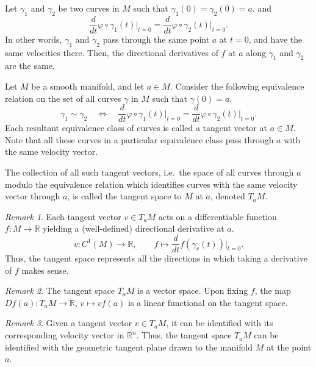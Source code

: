 \documentclass[11pt]{article}
\newcommand{\R}{\mathbb{R}}
\newcommand{\dd}[2]{\frac{d #1}{d #2}}
\theoremstyle{definition}
\theoremstyle{remark}
\newtheorem*{remark}{Remark}
\numberwithin{equation}{section}
\begin{document}
    \begin{lemma}
        Let $\gamma_1$ and $\gamma_2$ be two curves in $M$ such that $\gamma_1(0) =
        \gamma_2(0) = a$, and \[
            \dd{}{t} \varphi\circ \gamma_1(t)\Big|_{t = 0} = \dd{}{t} \varphi\circ
            \gamma_2(t)\Big|_{t = 0}.
        \] In other words, $\gamma_1$ and $\gamma_2$ pass through the same point $a$
        at $t = 0$, and have the same velocities there. Then, the directional
        derivatives of $f$ at $a$ along $\gamma_1$ and $\gamma_2$ are the same.
    \end{lemma}

    \begin{definition}
        Let $M$ be a smooth manifold, and let $a \in M$. Consider the following
        equivalence relation on the set of all curves $\gamma$ in $M$ such that
        $\gamma(0) = a$. \[
            \gamma_1 \sim \gamma_2 \quad\Longleftrightarrow\quad \dd{}{t} \varphi\circ
            \gamma_1(t)\Big|_{t = 0} = \dd{}{t} \varphi\circ \gamma_2(t)\Big|_{t =
            0}.
        \] Each resultant equivalence class of curves is called a tangent vector at
        $a \in M$. Note that all these curves in a particular equivalence class pass
        through $a$ with the same velocity vector.

        The collection of all such tangent vectors, i.e.\ the space of all curves
        through $a$ modulo the equivalence relation which identifies curves with the
        same velocity vector through $a$, is called the tangent space to $M$ at $a$,
        denoted $T_aM$.

        \begin{remark}
            Each tangent vector $v\in T_aM$ acts on a differentiable function
            $f\colon M \to \R$ yielding a (well-defined) directional derivative at
            $a$. \[
                v\colon C^1(M) \to \R, \qquad f\mapsto \dd{}{t}
                f(\gamma_v(t))\Big|_{t = 0}.
            \]
            Thus, the tangent space represents all the directions in which taking a
            derivative of $f$ makes sense.
        \end{remark}
        \begin{remark}
            The tangent space $T_aM$ is a vector space. Upon fixing $f$, the map
            $Df(a)\colon T_aM \to \R$, $v \mapsto vf(a)$ is a linear functional on
            the tangent space.
        \end{remark}
        \begin{remark}
            Given a tangent vector $v \in T_aM$, it can be identified with its
            corresponding velocity vector in $\R^n$. Thus, the tangent space $T_aM$
            can be identified with the geometric tangent plane drawn to the manifold
            $M$ at the point $a$.
        \end{remark}
    \end{definition}
\end{document}

